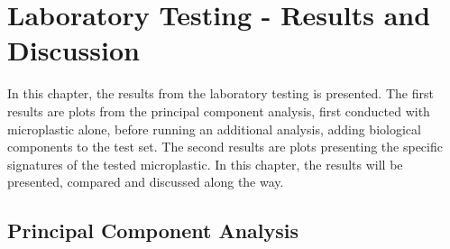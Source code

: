 \chapter{Laboratory Testing - Results and Discussion}
\label{chap:results}

In this chapter, the results from the laboratory testing is presented. The first results are plots from the principal component analysis, first conducted with microplastic alone, before running an additional analysis, adding biological components to the test set. The second results are plots presenting the specific signatures of the tested microplastic. In this chapter, the results will be presented, compared and discussed along the way. 

\section{Principal Component Analysis}

